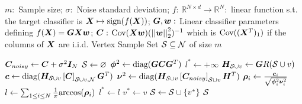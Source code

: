 \renewcommand{\algorithmicrequire}{\textbf{Input:}}
\renewcommand{\algorithmicensure}{\textbf{Output:}}
\begin{algorithm}
\caption{Classification-Optimal Sampling}\label{alg:class_opt_samp}
\begin{algorithmic}[1]

\Require $m:$ Sample size;
\Statex \hspace*{\algorithmicindent - 1em} $\sigma:$ Noise standard deviation; 
 \Statex \hspace*{\algorithmicindent - 1em} $f:\, \mathbb{R}^{N \times d} \to \mathbb{R}^{N}: $ linear function s.t. the target classifier is $\bm{X} \mapsto \text{sign}(f(\bm{X}))$;
 \Statex \hspace*{\algorithmicindent - 1em} $\bm{G}, \bm{w}:$ Linear classifier parameters defining $f(\bm{X}) = \bm{G}\bm{X}\bm{w}$;
 \Statex \hspace*{\algorithmicindent - 1em} $\bm{C}:$ $\text{Cov}(\bm{X}\bm{w})(\left\lvert\left\lvert\bm{w}\right\rvert\right\rvert^{2}_{2})^{-1}$ which is $\text{Cov}((\bm{X}^{T})_{1})$ if the columns of $\bm{X}$ are i.i.d.
\Ensure Vertex Sample Set $\mathcal{S} \subseteq \mathcal{N}$ of size $m$

\State $\bm{C}_{noisy} \gets \bm{C} + \sigma^{2}\bm{I}_{N}$
\State $\mathcal{S} \gets \varnothing$
\State $\bm{\phi}^{2} \gets \text{diag}(\bm{G}\bm{C}\bm{G}^{T})$
    \State $l^{*} \leftarrow +\infty$
        \State $\bm{H}_{\mathcal{S} \cup v} \gets \bm{G}R(\mathcal{S} \cup v)$ \label{alg:defn_H_S}
        \State $\vect{c} \gets \text{diag}(\matr{H}_{\set{S} \cup v}\msubgen[\set{S} \cup v,\set{N}]{\matr{C}}\matr{G}^{T})$
        \State $\vect{\nu}^{2} \gets \text{diag}(\matr{H}_{\set{S} \cup v}\msubgen[\set{S} \cup v]{\matr{C}_{noisy}}\matr{H}^{T})$
        \State $\bm{\rho}_{i} \gets \frac{\bm{c}_{i}}{\sqrt{\bm{\phi}^{2}_{i}\bm{\nu}^{2}_{i}}}$
        \EndFor
        \State $l \gets \sum_{1 \leq i \leq N} \frac{1}{\pi}\text{arccos}(\bm{\rho}_{i})$
            \State $l^* \gets l$
            \State $v^* \leftarrow v$
        \EndIf
    \EndFor
    \State $\mathcal{S} \leftarrow \mathcal{S} \cup \{v^*\}$
\EndWhile
\State \Return $\mathcal{S}$
\end{algorithmic}
\end{algorithm}

